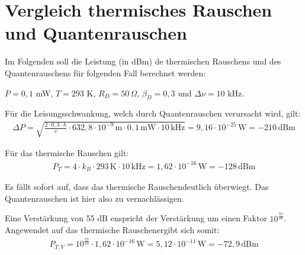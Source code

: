 
\section{Vergleich thermisches Rauschen und Quantenrauschen}

Im Folgenden soll die Leistung (in dBm) de thermischen Rauschens und des Quantenrauschens für folgenden Fall berechnet werden:

$P = 0,1$ mW, $T = 293$ K, $R_D = 50\, \Omega$, $\beta_D = 0,3$ und $\Delta \nu = 10$ kHz.

Für die Leisungsschwankung, welch durch Quantenrauschen verursacht wird, gilt:
\begin{gather}
    \Delta P = \sqrt{\frac{2\cdot0,3\cdot h}{c}\cdot 632,8 \cdot 10^{-9}\,\text{m} \cdot 0,1\, \text{mW} \cdot 10 \, \text{kHz}} = 9,16 \cdot 10^{-25}\, \text{W} = -210\, \text{dBm}
\end{gather}

Für das thermische Rauschen gilt:
\begin{gather}
    P_T = 4 \cdot k_B \cdot 293\,\text{K} \cdot 10\,\text{kHz} = 1,62 \cdot 10^{-16}\, \text{W} = -128 \, \text{dBm}
\end{gather}

Es fällt sofort auf, dass das thermische Rauschendeutlich überwiegt. Das Quantenrauschen ist hier also zu vernachlässigen.

Eine Verstärkung von 55 dB enspricht der Verstärkung um einen Faktor $ 10^{\frac{55}{10}}$.
Angewendet auf das thermische Rauschenergibt sich somit:
\begin{gather}
    P_{T,V} = 10^{\frac{55}{10}} \cdot 1,62 \cdot 10^{-16}\, \text{W} = 5,12 \cdot 10^{-11}\, \text{W} = -72,9 \, \text{dBm}
\end{gather}